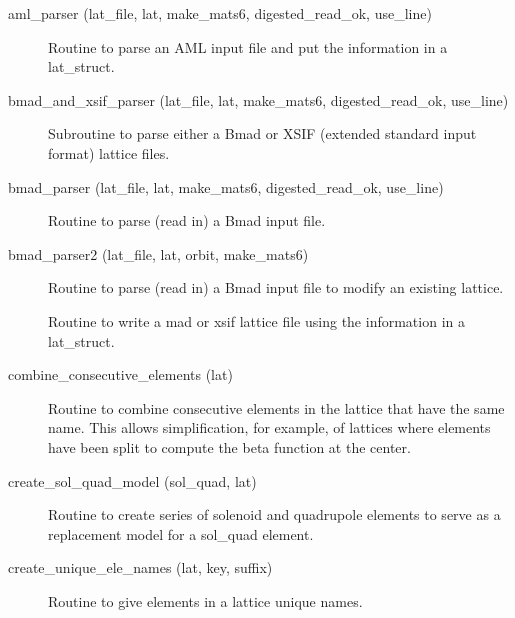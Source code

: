 \begin{description}

\label{r:aml.parser}
\item[aml_parser (lat_file, lat, make_mats6, digested_read_ok, use_line)] \Newline 
Routine to parse an AML input file and put the information in a lat_struct.

\label{r:bmad.and.xsif.parser}
\item[bmad_and_xsif_parser (lat_file, lat, make_mats6, digested_read_ok, use_line)] \Newline 
Subroutine to parse either a Bmad or XSIF (extended standard input format) lattice files.

\label{r:bmad.parser}
\item[bmad_parser (lat_file, lat, make_mats6, digested_read_ok, use_line)] \Newline
Routine to parse (read in) a Bmad input file. 

\label{r:bmad.parser2}
\item[bmad_parser2 (lat_file, lat, orbit, make_mats6)] \Newline
Routine to parse (read in) a Bmad input file to modify an existing lattice. 

\label{r:bmad.to.mad.or.xsif}
\item[\protect\parbox{6in}{bmad_to_mad_or_xsif (out_type, out_file_name, lat, use_matrix_model, \\
  \hspace*{1in} ix_start, ix_end, converted_lat, err)}] \Newline 
Routine to write a mad or xsif lattice file using the information in
a lat_struct. 

\label{r:combine.consecutive.elements}
\item[combine_consecutive_elements (lat)] \Newline 
Routine to combine consecutive elements in the lattice that have the same name.
This allows simplification, for example, of lattices where elements have been split 
to compute the beta function at the center.

\label{r:create.sol.quad.model}
\item[create_sol_quad_model (sol_quad, lat)] \Newline 
Routine to create series of solenoid and quadrupole elements to serve as a replacement
model for a sol_quad element.

\label{r:create.unique.ele.names}
\item[create_unique_ele_names (lat, key, suffix)] \Newline 
Routine to give elements in a lattice unique names.


\end{description}
